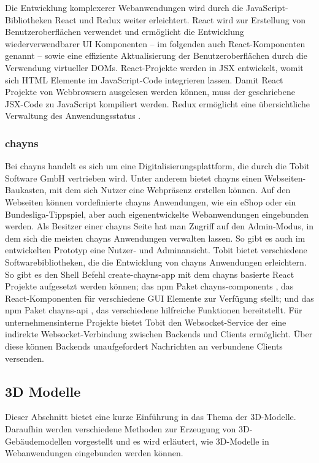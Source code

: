 Die Entwicklung komplexerer Webanwendungen wird durch die JavaScript-Bibliotheken React und Redux weiter erleichtert. React wird zur Erstellung von Benutzeroberflächen verwendet und ermöglicht die Entwicklung wiederverwendbarer \ac{UI} Komponenten – im folgenden auch React-Komponenten genannt – sowie eine effiziente Aktualisierung der Benutzeroberflächen durch die Verwendung virtueller \gls{DOM}s. React-Projekte werden in \ac{JSX} entwickelt, womit sich \ac{HTML} Elemente im JavaScript-Code integrieren lassen. Damit React Projekte von Webbrowsern ausgelesen werden können, muss der geschriebene \ac{JSX}-Code zu JavaScript kompiliert werden.\cite{React} Redux ermöglicht eine übersichtliche Verwaltung des Anwendungsstatus \cite{Redux}.

\subsubsection{chayns}\label{sec:Chayns}
Bei chayns handelt es sich um eine Digitalisierungsplattform, die durch die Tobit Software GmbH vertrieben wird. Unter anderem bietet chayns einen Webseiten-Baukasten, mit dem sich Nutzer eine Webpräsenz erstellen können. Auf den Webseiten können vordefinierte chayns Anwendungen, wie ein eShop oder ein Bundesliga-Tippspiel, aber auch eigenentwickelte Webanwendungen eingebunden werden.\cite{chayns} Als Besitzer einer chayns Seite hat man Zugriff auf den Admin-Modus, in dem sich die meisten chayns Anwendungen verwalten lassen. So gibt es auch im entwickelten Prototyp eine Nutzer- und Adminansicht. Tobit bietet verschiedene Softwarebibliotheken, die die Entwicklung von chayns Anwendungen erleichtern. So gibt es den Shell Befehl create-chayns-app \cite{CreateChaynsApp} mit dem chayns basierte React Projekte aufgesetzt werden können; das \ac{npm} Paket chayns-components \cite{ChaynsComponents}, das React-Komponenten für verschiedene \ac{GUI} Elemente zur Verfügung stellt; und das \ac{npm} Paket chayns-api \cite{ChaynsApi}, das verschiedene hilfreiche Funktionen bereitstellt. Für unternehmensinterne Projekte bietet Tobit den \gls{Websocket}-Service der eine indirekte \gls{Websocket}-Verbindung zwischen Backends und Clients ermöglicht. Über diese können Backends unaufgefordert Nachrichten an verbundene Clients versenden.

\subsection{3D Modelle}
Dieser Abschnitt bietet eine kurze Einführung in das Thema der 3D-Modelle. Daraufhin werden verschiedene Methoden zur Erzeugung von 3D-Gebäudemodellen vorgestellt und es wird erläutert, wie 3D-Modelle in Webanwendungen eingebunden werden können.

